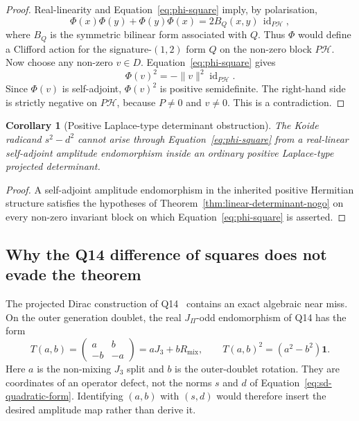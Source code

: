 \documentclass[11pt]{article}
\newtheorem{corollary}{Corollary}
\theoremstyle{definition}
\theoremstyle{remark}
\begin{document}
    \begin{proof}
      Real-linearity and Equation~\eqref{eq:phi-square} imply, by polarisation,
      \begin{equation}
        \label{eq:clifford-polarisation}
        \Phi(x)\Phi(y)+\Phi(y)\Phi(x)
        =2B_Q(x,y)\,\operatorname{id}_{P\mathcal H},
      \end{equation}
      where $B_Q$ is the symmetric bilinear form associated with $Q$.
      Thus $\Phi$ would define a Clifford action for the signature-$(1,2)$ form $Q$ on the non-zero block
      $P\mathcal H$.
      Now choose any non-zero $v\in D$.
      Equation~\eqref{eq:phi-square} gives
      \[
        \Phi(v)^2=-\lVert v\rVert^2\operatorname{id}_{P\mathcal H}.
      \]
      Since $\Phi(v)$ is self-adjoint, $\Phi(v)^2$ is positive semidefinite.
      The right-hand side is strictly negative on $P\mathcal H$, because $P\neq0$ and $v\neq0$.
      This is a contradiction.
    \end{proof}

    \begin{corollary}[Positive Laplace-type determinant obstruction]
      \label{cor:positive-determinant-obstruction}
      The Koide radicand $s^2-d^2$ cannot arise through Equation~\eqref{eq:phi-square} from a real-linear
      self-adjoint amplitude endomorphism inside an ordinary positive Laplace-type projected determinant.
    \end{corollary}

    \begin{proof}
      A self-adjoint amplitude endomorphism in the inherited positive Hermitian structure satisfies the hypotheses
      of Theorem~\ref{thm:linear-determinant-nogo} on every non-zero invariant block on which
      Equation~\eqref{eq:phi-square} is asserted.
    \end{proof}

    \subsection{Why the Q14 difference of squares does not evade the theorem}
      \label{subsec:q14-near-miss}

      The projected Dirac construction of Q14~\cite{Beau2026q14} contains an exact algebraic near miss.
      On the outer generation doublet, the real $J_\Pi$-odd endomorphism of Q14 has the form
      \begin{equation}
        \label{eq:q14-block}
        T(a,b)
        =
        \begin{pmatrix}
          a & b \\
          -b & -a
        \end{pmatrix}
        =aJ_3+bR_{\mathrm{mix}},
        \qquad
        T(a,b)^2=(a^2-b^2)\mathbf 1 .
      \end{equation}
      Here $a$ is the non-mixing $J_3$ split and $b$ is the outer-doublet rotation.
      They are coordinates of an operator defect, not the norms $s$ and $d$ of
      Equation~\eqref{eq:sd-quadratic-form}.
      Identifying $(a,b)$ with $(s,d)$ would therefore insert the desired amplitude map rather than derive it.
\end{document}
